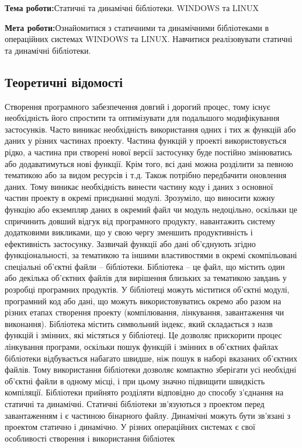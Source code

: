 \documentclass[12pt]{extarticle}
\begin{document}
\textbf{Тема роботи:}Статичні та динамічні бібліотеки. WINDOWS та LINUX
\vspace{12pt}

\textbf{Мета роботи:}Ознайомитися з статичними та динамічними бібліотеками в операційних
системах WINDOWS та LINUX. Навчитися реалізовувати статичні та динамічні
бібліотеки.

\subsection*{Теоретичні відомості}
Створення програмного забезпечення довгий і дорогий процес, тому існує
необхідність його спростити та оптимізувати для подальшого модифікування
застосунків. Часто виникає необхідність використання одних і тих ж функцій або
даних у різних частинах проекту. Частина функцій у проекті використовується
рідко, а частина при створені нової версії застосунку буде постійно змінюватись
або додаватимуться нові функції. Крім того, всі дані можна розділити за певною
тематикою або за видом ресурсів і т.д. Також потрібно передбачити оновлення
даних. Тому виникає необхідність винести частину коду і даних з основної
частин проекту в окремі приєднанні модулі.
Зрозуміло, що виносити кожну функцію або екземпляр даних в окремий
файл чи модуль недоцільно, оскільки це спричинить довший відгук від
програмного продукту, навантажить систему додатковими викликами, що у свою
чергу зменшить продуктивність і ефективність застосунку. Зазвичай функції або
дані об’єднують згідно функціональності, за тематикою та іншими
властивостями в окремі скомпільовані спеціальні об’єктні файли – бібліотеки.
Бібліотека – це файл, що містить один або декілька об’єктних файлів для
вирішення близьких за тематикою завдань у розробці програмних продуктів. У
бібліотеці можуть міститися об’єктні модулі, програмний код або дані, що
можуть використовуватись окремо або разом на різних етапах створення проекту
(компілювання, лінкування, завантаження чи виконання).
Бібліотека містить символьний індекс, який складається з назв функцій і
змінних, які містяться у бібліотеці. Це дозволяє прискорити процес лінкування
програми, оскільки пошук функцій і змінних в об'єктних файлах бібліотеки
відбувається набагато швидше, ніж пошук в наборі вказаних об'єктних файлів.
Тому використання бібліотеки дозволяє компактно зберігати усі необхідні
об'єктні файли в одному місці, і при цьому значно підвищити швидкість
компіляції.
Бібліотеки прийнято розділяти відповідно до способу з’єднання на
статичні та динамічні. Статичні бібліотеки зв’язуються з проектом перед
завантаженням і є частиною бінарного файлу. Динамічні можуть бути зв’язані з
проектом статично і динамічно. У різних операційних системах є свої
особливості створення і використання бібліотек
\end{document}
